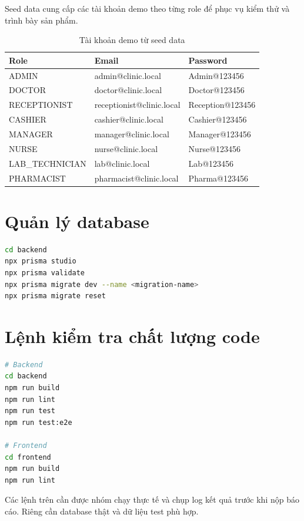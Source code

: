 Seed data cung cấp các tài khoản demo theo từng role để phục vụ kiểm thử và trình bày sản phẩm.

\begin{longtable}{|p{3.2cm}|p{5.5cm}|p{4cm}|}
\caption{Tài khoản demo từ seed data}\\
\hline
\textbf{Role} & \textbf{Email} & \textbf{Password} \\
\hline
ADMIN & admin@clinic.local & Admin@123456 \\
\hline
DOCTOR & doctor@clinic.local & Doctor@123456 \\
\hline
RECEPTIONIST & receptionist@clinic.local & Reception@123456 \\
\hline
CASHIER & cashier@clinic.local & Cashier@123456 \\
\hline
MANAGER & manager@clinic.local & Manager@123456 \\
\hline
NURSE & nurse@clinic.local & Nurse@123456 \\
\hline
LAB\_\allowbreak TECHNICIAN & lab@clinic.local & Lab@123456 \\
\hline
PHARMACIST & pharmacist@clinic.local & Pharma@123456 \\
\hline
\end{longtable}

\section{Quản lý database}

\begin{lstlisting}[language=bash,caption={Các lệnh quản lý database}]
cd backend
npx prisma studio
npx prisma validate
npx prisma migrate dev --name <migration-name>
npx prisma migrate reset
\end{lstlisting}

\section{Lệnh kiểm tra chất lượng code}

\begin{lstlisting}[language=bash,caption={Các lệnh kiểm tra build, lint và test}]
# Backend
cd backend
npm run build
npm run lint
npm run test
npm run test:e2e

# Frontend
cd frontend
npm run build
npm run lint
\end{lstlisting}

Các lệnh trên cần được nhóm chạy thực tế và chụp log kết quả trước khi nộp báo cáo. Riêng  cần database thật và dữ liệu test phù hợp.

